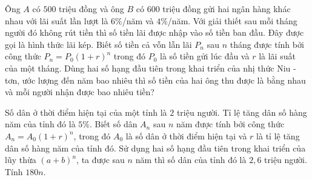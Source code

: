 \begin{bt}%
	Ông $A$ có $500$ triệu đồng và ông $B$ có $600$ triệu đồng gửi hai ngân hàng khác nhau với lãi suất lần lượt là $6\%$/năm và $4\%$/năm. Với giải thiết sau mỗi tháng người đó không rút tiền thì số tiền lãi được nhập vào số tiền ban đầu. Đây được gọi là hình thức lãi kép. Biết số tiền cả vỗn lẫn lãi $P_n$ sau $n$ tháng được tính bởi công thức $P_n=P_0\left(1+r\right)^n$ trong đó $P_0$ là số tiền gửi lúc đầu và $r$ là lãi suất của một tháng. Dùng hai số hạng đầu tiên trong khai triển của nhị thức Niu - tơn, ước lượng đến năm bao nhiêu thì số tiền của hai ông thu được là bằng nhau và mỗi người nhận được bao nhiêu tiền?
\end{bt}

\begin{bt}%
	Số dân ở thời điểm hiện tại của một tỉnh là $2$ triệu người. Tỉ lệ tăng dân số hàng năm của tỉnh đó là $5\%$. Biết số dân $A_n$ sau $n$ năm được tính bởi công thức $A_n=A_0(1+r)^n$, trong đó $A_0$ là số dân ở thời điểm hiện tại và $r$ là tỉ lệ tăng dân số hàng năm của tỉnh đó. Sử dụng hai số hạng đầu tiên trong khai triển của lũy thừa $(a+b)^n$, ta được sau $n$ năm thì số dân của tỉnh đó là $2{,}6$ triệu người. Tính $180 n$.
\end{bt}
